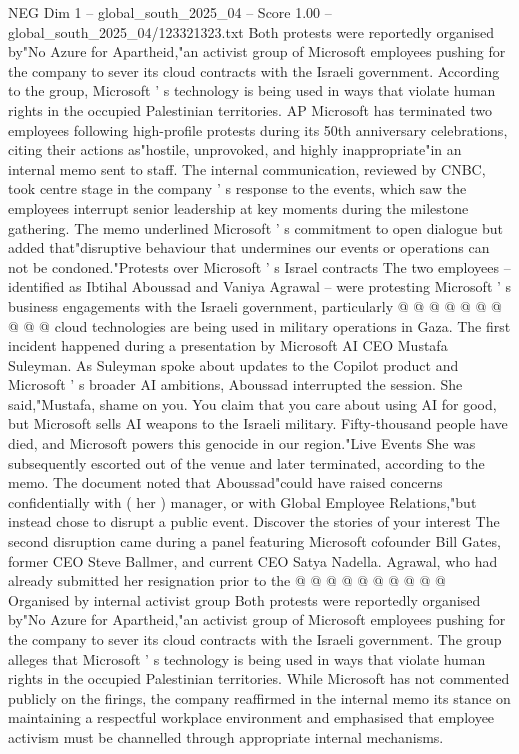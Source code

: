 \begin{textsample}{NEG Dim 1 – global\_south\_2025\_04 – Score 1.00 – global\_south\_2025\_04/123321323.txt}  \label{ex:f1_neg_135}
Both protests were reportedly organised by"No Azure for Apartheid,"an activist group of Microsoft employees pushing for the company to sever its cloud contracts with the Israeli government.
According to the group, Microsoft ' s technology is being used in ways that violate human rights in the occupied Palestinian territories.
AP Microsoft has terminated two employees following high-profile protests during its 50th anniversary celebrations, citing their actions as"hostile, unprovoked, and highly inappropriate"in an internal memo sent to staff.
The internal communication, reviewed by CNBC, took centre stage in the company ' s response to the events, which saw the employees interrupt senior leadership at key moments during the milestone gathering.
The memo underlined Microsoft ' s commitment to open dialogue but added that"disruptive behaviour that undermines our events or operations can not be condoned."Protests over Microsoft ' s Israel contracts The two employees -- identified as Ibtihal Aboussad and Vaniya Agrawal -- were protesting Microsoft ' s business engagements with the Israeli government, particularly @ @ @ @ @ @ @ @ @ @ cloud technologies are being used in military operations in Gaza.
The first incident happened during a presentation by Microsoft AI CEO Mustafa Suleyman.
As Suleyman spoke about updates to the Copilot product and Microsoft ' s broader AI ambitions, Aboussad interrupted the session.
She said,"Mustafa, shame on you.
You claim that you care about using AI for good, but Microsoft sells AI weapons to the Israeli military.
Fifty-thousand people have died, and Microsoft powers this genocide in our region."Live Events She was subsequently escorted out of the venue and later terminated, according to the memo.
The document noted that Aboussad"could have raised concerns confidentially with ( her ) manager, or with Global Employee Relations,"but instead chose to disrupt a public event.
Discover the stories of your interest The second disruption came during a panel featuring Microsoft cofounder Bill Gates, former CEO Steve Ballmer, and current CEO Satya Nadella.
Agrawal, who had already submitted her resignation prior to the @ @ @ @ @ @ @ @ @ @ Organised by internal activist group Both protests were reportedly organised by"No Azure for Apartheid,"an activist group of Microsoft employees pushing for the company to sever its cloud contracts with the Israeli government.
The group alleges that Microsoft ' s technology is being used in ways that violate human rights in the occupied Palestinian territories.
While Microsoft has not commented publicly on the firings, the company reaffirmed in the internal memo its stance on maintaining a respectful workplace environment and emphasised that employee activism must be channelled through appropriate internal mechanisms.

\end{textsample}
